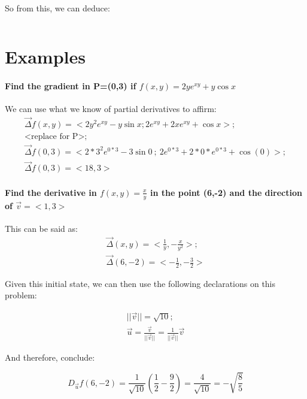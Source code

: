 \documentclass[11pt,fleqn]{book} %
\begin{document}
So from this, we can deduce:
\begin{gather}
    \\
\end{gather}

\section{Examples}

\paragraph*{Find the gradient in P=(0,3) if $f(x,y)=2ye^{xy}+ y \cos x$} 
We can use what we know of partial derivatives to affirm:
\begin{gather}
    \vec{\Delta}f(x,y) = <2y^2 e^{xy} - y \sin x ; 2e^{xy}+2xe^{xy} + \cos x>;\\
    \text{<replace for P>};\\
    \vec{\Delta}f(0,3) = <2*3^2 e^{0*3} - 3 \sin 0 \ ; \ 2e^{0*3} + 2* 0 *e^{0*3} + \cos (0)>;\\
    \vec{\Delta}f(0,3) = <18,3>
\end{gather}

\paragraph*{Find the derivative in $f(x,y) = \frac{x}{y}$ in the point
(6,-2) and the direction of $\vec{v} = <1,3>$} 

This can be said as:
\begin{gather}
    \vec{\Delta}(x,y) = <\frac{1}{y},-\frac{x}{y^2}>;\\
    \vec{\Delta}(6,-2) = <- \frac{1}{2},-\frac{3}{2}>
\end{gather}

Given this initial state, we can then use the following declarations on this problem:

\begin{gather}
    ||\vec{v}|| = \sqrt{10};\\
    \vec{u} = \frac{\vec{v}}{||\vec{v}||} = \frac{1}{||\vec{v}||} \vec{v}
\end{gather}

And therefore, conclude:

\begin{equation}
    D_{\vec{u}}f(6,-2) = \frac{1}{\sqrt{10}} (\frac{1}{2} - \frac{9}{2}) = \frac{4}{\sqrt{10}} = -\sqrt{\frac{8}{5}}
\end{equation}
\end{document}
